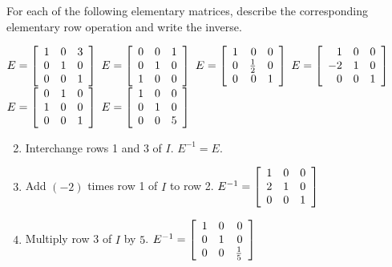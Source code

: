\begin{multicols}{2}
\begin{ex}
For each of the following elementary matrices, describe the corresponding elementary row operation and write the inverse.
\begin{exenumerate}
\exitem $E = \left[ \begin{array}{rrr}
1 & 0 & 3 \\
0 & 1 & 0 \\
0 & 0 & 1
\end{array} \right]$
\exitem $E = \left[ \begin{array}{rrr}
0 & 0 & 1 \\
0 & 1 & 0 \\
1 & 0 & 0
\end{array} \right]$
\exitem $E = \left[ \begin{array}{rrr}
1 & 0 & 0 \\
0 & \tfrac{1}{2} & 0 \\
0 & 0 & 1
\end{array} \right]$
\exitem $E = \left[ \begin{array}{rrr}
1 & 0 & 0 \\
-2 & 1 & 0 \\
0 & 0 & 1
\end{array} \right]$
\exitem $E = \left[ \begin{array}{rrr}
0 & 1 & 0 \\
1 & 0 & 0 \\
0 & 0 & 1
\end{array} \right]$
\exitem $E = \left[ \begin{array}{rrr}
1 & 0 & 0 \\
0 & 1 & 0 \\
0 & 0 & 5
\end{array} \right]$
\end{exenumerate}
\begin{sol}
\begin{enumerate}[label={\alph*.}]
\setcounter{enumi}{1}
\item Interchange rows 1 and 3 of $I$. $E^{-1} = E$.

\setcounter{enumi}{3}
\item Add $(-2)$ times row 1 of $I$ to row 2. $E^{-1} = \left[ \begin{array}{rrr}
1 & 0 & 0 \\
2 & 1 & 0 \\
0 & 0 & 1
\end{array} \right]$

\setcounter{enumi}{5}
\item Multiply row 3 of $I$ by $5$. $E^{-1} = \left[ \begin{array}{rrr}
1 & 0 & 0 \\
0 & 1 & 0 \\
0 & 0 & \tfrac{1}{5}
\end{array} \right]$


\end{enumerate}
\end{sol}
\end{ex}
\end{multicols}

